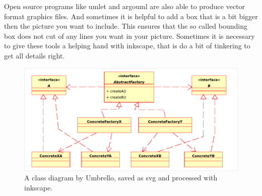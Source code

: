 Open source programs like umlet and argouml are also able to produce
vector format graphics files. And sometimes it is helpful to add a box 
that is a bit bigger then the picture you want to include.
This ensures that the so called bounding box does not cut of any lines
you want in your picture. Sometimes it is necessary to give these
tools a helping hand with inkscape, that is do a bit of tinkering to
get all details right.
\begin{figure}[htbp]
  \centering
  \includegraphics[width=.6\textwidth]{figures/factory}
  \caption[A class diagram by Umbrello]{A class diagram by Umbrello, saved as svg and processed
    with inkscape.}
  \label{fig:factory}
\end{figure}


